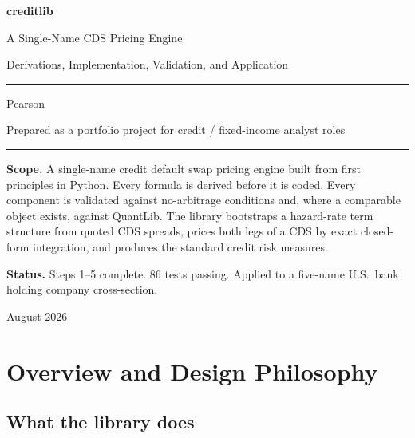 \documentclass[11pt,a4paper]{article}
\begin{document}
\begin{titlepage}
\centering
\vspace*{2.4cm}
{\Huge\bfseries\color{accent} creditlib\par}
\vspace{0.7em}
{\LARGE A Single-Name CDS Pricing Engine\par}
\vspace{0.5em}
{\large Derivations, Implementation, Validation, and Application\par}
\vspace{2.4cm}
\rule{0.62\textwidth}{0.6pt}\par
\vspace{1.1em}
{\large Pearson\par}
\vspace{0.4em}
{\normalsize Prepared as a portfolio project for credit / fixed-income analyst roles\par}
\vspace{1.1em}
\rule{0.62\textwidth}{0.6pt}\par
\vspace{2.6cm}

\begin{minipage}{0.82\textwidth}\small
\textbf{Scope.} A single-name credit default swap pricing engine built from first
principles in Python. Every formula is derived before it is coded. Every component is
validated against no-arbitrage conditions and, where a comparable object exists, against
QuantLib. The library bootstraps a hazard-rate term structure from quoted CDS spreads,
prices both legs of a CDS by exact closed-form integration, and produces the standard
credit risk measures.

\medskip
\textbf{Status.} Steps 1--5 complete. 86 tests passing. Applied to a five-name
U.S.\ bank holding company cross-section.
\end{minipage}

\vfill
{\small August 2026}
\end{titlepage}

\tableofcontents
\newpage

\section{Overview and Design Philosophy}

\subsection{What the library does}
\end{document}
